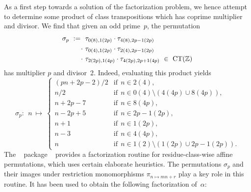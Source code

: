 \documentclass{amsart}
\theoremstyle{definition} \newtheorem{CTZDefinition}{Definition}[section]
\theoremstyle{plain}      \newtheorem{CTZPropertiesTheorem}[CTZDefinition]{Theorem}
\theoremstyle{plain}      \newtheorem{CTZSubgroupsTheorem}[CTZDefinition]{Theorem}
\theoremstyle{definition} \newtheorem{RcwaMappingDefinition}{Definition}[section]
\theoremstyle{definition} \newtheorem{RCWADefinition}[RcwaMappingDefinition]{Definition}
\theoremstyle{plain}      \newtheorem{CTZNotFinitelyGeneratedTheorem}
\theoremstyle{definition} \newtheorem{CTZSmEmbeddingDefinition}[RcwaMappingDefinition]{Definition}
\theoremstyle{plain}      \newtheorem{CTZHighlyTransitiveTheorem}[RcwaMappingDefinition]{Theorem}
\theoremstyle{plain}      \newtheorem{CTZTorsionElementsDivisibleTheorem}
\theoremstyle{plain}      \newtheorem{CTLemma}{Lemma}[section]
\theoremstyle{plain}      \newtheorem{IntegralCommutatorLemma}[CTLemma]{Lemma}
\theoremstyle{plain}      \newtheorem{NormalSubgroupContainsIntegralElementLemma}[CTLemma]{Lemma}
\theoremstyle{plain}      \newtheorem{CTZSimpleTheorem}[CTLemma]{Theorem}
\theoremstyle{remark}     \newtheorem{CTZSimpleRemark}[CTLemma]{Remark}
\theoremstyle{definition} \newtheorem{CTPZDefinition}[CTLemma]{Definition}
\theoremstyle{plain}      \newtheorem{CTPZSimpleCorollary}[CTLemma]{Corollary}
\theoremstyle{plain}      \newtheorem{CTPZSimpleProblem}[CTLemma]{Problem}
\theoremstyle{plain}      \newtheorem{FnPSL2ZEmbeddingTheorem}{Theorem}[section]
\theoremstyle{plain}      \newtheorem{FreeProductEmbeddingTheorem}[FnPSL2ZEmbeddingTheorem]{Theorem}
\theoremstyle{definition} \newtheorem{RestrictionMonomorphismDefinition}
\theoremstyle{plain}      \newtheorem{DirectAndWreathProductsEmbeddingTheorem}
\theoremstyle{plain}      \newtheorem{DirectAndWreathProductsEmbeddingCorollary}
\theoremstyle{definition} \newtheorem{CTintZDefinition}[FnPSL2ZEmbeddingTheorem]{Definition}
\theoremstyle{plain}      \newtheorem{CTintZSimpleTheorem}[FnPSL2ZEmbeddingTheorem]{Theorem}
\theoremstyle{definition} \newtheorem{KernelDefinition}{Definition}[section]
\theoremstyle{definition} \newtheorem{TameWildDefinition}[KernelDefinition]{Definition}
\theoremstyle{definition} \newtheorem{SimpleSupergroupsDefinition}[KernelDefinition]{Definition}
\theoremstyle{definition} \newtheorem{CSCRDefinition}[KernelDefinition]{Definition}
\theoremstyle{plain}      \newtheorem{SimpleSupergroupsGeneratorsTheorem}[KernelDefinition]{Theorem}
\theoremstyle{plain}      \newtheorem{SimpleSupergroupsTheorem}[KernelDefinition]{Theorem}
\theoremstyle{plain}      \newtheorem{SimpleSupergroupsTransitivityTheorem}
\theoremstyle{plain}      \newtheorem{TameGenerationConjecture}[KernelDefinition]{Conjecture}
\theoremstyle{remark}     \newtheorem{TameGenerationRemark}[KernelDefinition]{Remark}
\begin{document}
As a first step towards a solution of the factorization problem, we hence attempt to
determine some product of class transpositions which has coprime multiplier and divisor.
We find that given an odd prime~\(p\), the permutation
\begin{align*}
  \sigma_p \ := \ \ &\tau_{0(8),1(2p)} \cdot \tau_{4(8),2p-1(2p)} \\
            \cdot \ &\tau_{0(4),1(2p)} \cdot \tau_{2(4),2p-1(2p)} \\
            \cdot \ &\tau_{2(2p),1(4p)} \cdot \tau_{4(2p),2p+1(4p)} \ \in \ \CT{\ZZ}
\end{align*}
has multiplier \(p\) and divisor~2. Indeed, evaluating this product yields
\[
  \sigma_p: \ \ n \ \longmapsto \
  \begin{cases}
    (pn + 2p - 2)/2 & \text{if} \ \ n \in 2(4), \\
    n/2             & \text{if} \ \ n \in 0(4) \setminus (4(4p) \cup 8(4p)), \\
    n + 2p - 7      & \text{if} \ \ n \in 8(4p), \\
    n - 2p + 5      & \text{if} \ \ n \in 2p-1(2p), \\
    n + 1           & \text{if} \ \ n \in 1(2p), \\
    n - 3           & \text{if} \ \ n \in 4(4p), \\
    n               & \text{if} \ \ n \in 1(2) \setminus (1(2p) \cup 2p-1(2p)).
  \end{cases}
\]
The \GAP~\cite{GAP4} package \RCWAPackage~\cite{Kohl05a} provides a factorization routine for
residue-class-wise affine permutations, which uses certain elaborate heuristics. The permutations
\(\sigma_p\) and their images under restriction monomorphisms \(\pi_{n \mapsto mn+r}\) play a key
role in this routine. It has been used to obtain the following factorization of~\(\alpha\):
\end{document}
